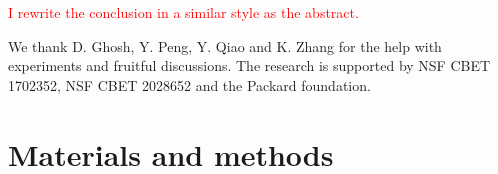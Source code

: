 \documentclass[twocolumn,aps,prx,amsmath,amssymb,longbibliography,superscriptaddress]{revtex4-2}
\begin{document}

\textcolor{red}{I rewrite the conclusion in a similar style as the abstract.}


\begin{acknowledgements}
	We thank D. Ghosh, Y. Peng, Y. Qiao and K. Zhang for the help with experiments and fruitful discussions. The research is supported by NSF CBET 1702352, NSF CBET 2028652 and the Packard foundation.
\end{acknowledgements}

\appendix
\section{Materials and methods} \label{appendix-MM}
\end{document}
